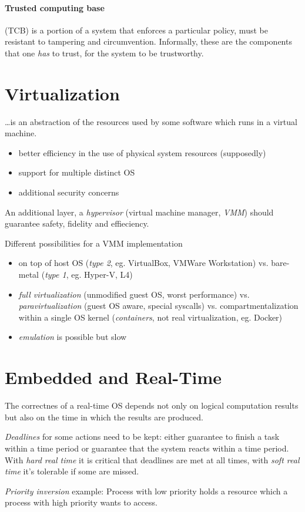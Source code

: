 \documentclass{article}
\begin{document}
\begin{multicols}{1}
\paragraph{Trusted computing base} (TCB) is a portion of a system that enforces a particular policy, must be resistant to tampering and circumvention. Informally, these are the components that one \emph{has} to trust, for the system to be trustworthy.

\section*{Virtualization}

\ldots is an abstraction of the resources used by some software which runs in a virtual machine.

\begin{itemize}
    \item better efficiency in the use of physical system resources (supposedly)
    \item support for multiple distinct OS
    \item additional security concerns
\end{itemize}

An additional layer, a \emph{hypervisor} (virtual machine manager, \emph{VMM}) should guarantee safety, fidelity and effieciency.

Different possibilities for a VMM implementation

\begin{itemize}
    \item on top of host OS (\emph{type 2}, eg. VirtualBox, VMWare Workstation) vs. bare-metal (\emph{type 1}, eg. Hyper-V, L4)
    \item \emph{full virtualization} (unmodified guest OS, worst performance) vs. \emph{paravirtualization} (guest OS aware, special syscalls) vs. compartmentalization within a single OS kernel (\emph{containers}, not real virtualization, eg. Docker)
    \item \emph{emulation} is possible but slow
\end{itemize}

\section*{Embedded and Real-Time}

The correctnes of a real-time OS depends not only on logical computation results but also on the time in which the results are produced.

\emph{Deadlines} for some actions need to be kept: either guarantee to finish a task within a time period or guarantee that the system reacts within a time period. With \emph{hard real time} it is critical that deadlines are met at all times, with \emph{soft real time} it's tolerable if some are missed.

\emph{Priority inversion} example: Process with low priority holds a resource which a process with high priority wants to access.

\end{multicols}
\end{document}
